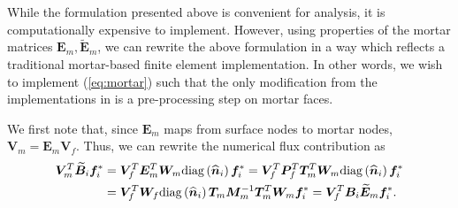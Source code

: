 \documentclass[review]{siamart0216}
\renewcommand{\tilde}{\widetilde}
\renewcommand{\hat}{\widehat}
\newcommand{\LRp}[1]{\left( #1 \right)}
\newcommand{\diag}[1]{{\rm diag}\LRp{#1}}
\begin{document}
While the formulation presented above is convenient for analysis, it is computationally expensive to implement.  However, using properties of the mortar matrices $\bm{E}_m, \tilde{\bm{E}}_m$, we can rewrite the above formulation in a way which reflects a traditional mortar-based finite element implementation.  In other words, we wish to implement (\ref{eq:mortar}) such that the only modification from the implementations in \cite{chan2017discretely} is a pre-processing step on mortar faces.  

We first note that, since $\bm{E}_m$ maps from surface nodes to mortar nodes, $\bm{V}_m = \bm{E}_m \bm{V}_f$.  Thus, we can rewrite the numerical flux contribution as
\begin{align*}
 \bm{V}_m^T\tilde{\bm{B}}_i\bm{f}_i^* &= \bm{V}_f^T \bm{E}_m^T \bm{W}_m\diag{\hat{\bm{n}}_i} \bm{f}_i^* = \bm{V}_f^T  \bm{P}_f^T\bm{T}_m^T\bm{W}_m\diag{\hat{\bm{n}}_i} \bm{f}_i^*\\
 &= \bm{V}_f^T \bm{W}_f \diag{\hat{\bm{n}}_i} \bm{T}_m\bm{M}_m^{-1}\bm{T}_m^T\bm{W}_m \bm{f}_i^* =  \bm{V}_f^T \bm{B}_i \tilde{\bm{E}}_m\bm{f}_i^*.
\end{align*}
\end{document}
